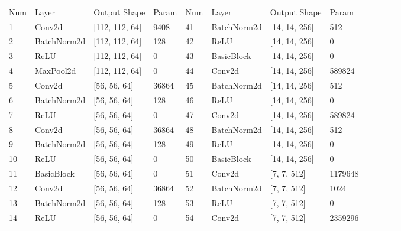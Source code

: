 \begin{table}[!hpt]
    \label{tab:output_shape_and_param}
    \centering
    \begin{tabular}{@{}llllllllllll@{}} \toprule
        Num & Layer         & Output Shape      & Param   &  Num & Layer        & Output Shape      & Param         \\ 
        1  & Conv2d         & [112, 112, 64]    & 9408    &  41 & BatchNorm2d   & [14, 14, 256]     & 512           \\
        2  & BatchNorm2d    & [112, 112, 64]    & 128     &  42 & ReLU          & [14, 14, 256]     & 0             \\
        3  & ReLU           & [112, 112, 64]    & 0       &  43 & BasicBlock    & [14, 14, 256]     & 0             \\
        4  & MaxPool2d      & [112, 112, 64]    & 0       &  44 & Conv2d        & [14, 14, 256]     & 589824        \\
        5  & Conv2d         & [56, 56, 64]      & 36864   &  45 & BatchNorm2d   & [14, 14, 256]     & 512           \\
        6  & BatchNorm2d    & [56, 56, 64]      & 128     &  46 & ReLU          & [14, 14, 256]     & 0             \\
        7  & ReLU           & [56, 56, 64]      & 0       &  47 & Conv2d          & [14, 14, 256]     & 589824      \\
        8  & Conv2d         & [56, 56, 64]      & 36864   &  48 & BatchNorm2d     & [14, 14, 256]     & 512         \\
        9  & BatchNorm2d    & [56, 56, 64]      & 128     &  49 & ReLU            & [14, 14, 256]     & 0           \\
        10 & ReLU           & [56, 56, 64]      & 0       &  50 & BasicBlock      & [14, 14, 256]     & 0           \\
        11 & BasicBlock     & [56, 56, 64]      & 0       &  51 & Conv2d          & [7, 7, 512]       & 1179648     \\
        12 & Conv2d         & [56, 56, 64]      & 36864   &  52 & BatchNorm2d     & [7, 7, 512]       & 1024        \\
        13 & BatchNorm2d    & [56, 56, 64]      & 128     &  53 & ReLU            & [7, 7, 512]       & 0           \\
        14 & ReLU           & [56, 56, 64]      & 0       &  54 & Conv2d          & [7, 7, 512]       & 2359296     \\

\end{tabular}
\end{table}
